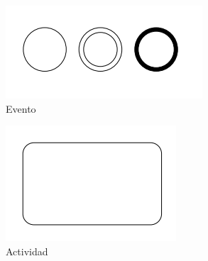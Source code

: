 \begin{figure}[H]
    \centering
    \begin{subfigure}[b]{0.4\textwidth}
        \centering
        \includegraphics[width=\textwidth]{img/bpmn-event.png}
        \caption{Evento}
    \end{subfigure}
    \hfill
    \begin{subfigure}[b]{0.3\textwidth}
        \centering
        \includegraphics[width=\textwidth]{img/bpmn-activity.png}
        \caption{Actividad}
    \end{subfigure}
    \hfill
    \begin{subfigure}[b]{0.2\textwidth}
        \centering

\end{subfigure}
\end{figure}

